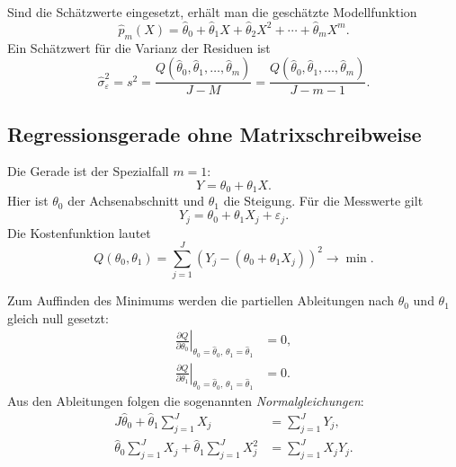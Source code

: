 Sind die Schätzwerte eingesetzt, erhält man die geschätzte Modellfunktion
\begin{equation}
\hat p_m(X) = \hat\theta_0 + \hat\theta_1 X + \hat\theta_2 X^2 + \cdots + \hat\theta_m X^m .
\end{equation}
Ein Schätzwert für die Varianz der Residuen ist
\begin{equation}
\hat\sigma^2_\varepsilon = s^2 =
\frac{Q(\hat{\theta}_0,\hat{\theta}_1,\ldots,\hat{\theta}_m)}{J-M}
= \frac{Q(\hat{\theta}_0,\hat{\theta}_1,\ldots,\hat{\theta}_m)}{J-m-1} .
\label{eq:s_quadrat_Regresssion}
\end{equation}

\subsection{Regressionsgerade ohne Matrixschreibweise}

Die Gerade ist der Spezialfall $m=1$:
\begin{equation}
  Y = \theta_0 + \theta_1 X.
\end{equation}
Hier ist $\theta_0$ der Achsenabschnitt und $\theta_1$ die
Steigung. Für die Messwerte gilt
\begin{equation}
  Y_j = \theta_0 + \theta_1 X_j + \varepsilon_j.
\end{equation}
Die Kostenfunktion lautet
\begin{equation}
  Q(\theta_0,\theta_1)
  = \sum_{j=1}^{J}
    \left(Y_j-(\theta_0+\theta_1 X_j)\right)^2
  \longrightarrow \min.
  \label{eq:linRegrMinimierung}
\end{equation}

Zum Auffinden des Minimums werden die partiellen Ableitungen
nach $\theta_0$ und $\theta_1$ gleich null gesetzt:
\begin{equation}
  \begin{aligned}
    \left.
      \frac{\partial Q}{\partial\theta_0}
    \right|_{\theta_0=\hat\theta_0,\,
             \theta_1=\hat\theta_1}
    &=0,\\
    \left.
      \frac{\partial Q}{\partial\theta_1}
    \right|_{\theta_0=\hat\theta_0,\,
             \theta_1=\hat\theta_1}
    &=0.
  \end{aligned}
  \label{GleichungssytemKostenfkt}
\end{equation}
Aus den Ableitungen folgen die sogenannten
\textsl{Normalgleichungen}:
\begin{align}
  J\hat\theta_0
  +\hat\theta_1\sum_{j=1}^{J}X_j
  &=\sum_{j=1}^{J}Y_j,\\
  \hat\theta_0\sum_{j=1}^{J}X_j
  +\hat\theta_1\sum_{j=1}^{J}X_j^2
  &=\sum_{j=1}^{J}X_jY_j.
\end{align}

